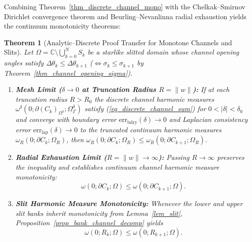 \documentclass[11pt,reqno]{amsart}
\newtheorem{thm}{Theorem}[section]
\numberwithin{equation}{section}
\newcommand{\C}{\mathbb{C}}
\begin{document}
Combining Theorem~\ref{thm_discrete_channel_mono} with the Chelkak--Smirnov Dirichlet convergence theorem \cite[Theorem~3.12]{CS} and Beurling--Nevanlinna radial exhaustion yields the continuum monotonicity theorems:

\begin{thm}[Analytic--Discrete Proof Transfer for Monotone Channels and Slits] \label{thm_analytic_discrete_transfer}
Let $\varOmega = \C \setminus \bigcup_{k=0}^N S_k$ be a starlike slitted domain whose channel opening angles satisfy $\Delta\theta_k \le \Delta\theta_{k+1}$ ($\iff \sigma_k \le \sigma_{k+1}$ by Theorem~\ref{thm_channel_opening_sigma}).
\begin{enumerate}
\item \textbf{Mesh Limit ($\delta \to 0$ at Truncation Radius $R = \|w\|$):} If at each truncation radius $R > R_0$ the discrete channel harmonic measures $\omega^{\delta}(0; \partial(C_k)_{\Omega^{\delta}}; \varOmega^{\delta}_{\varGamma})$ satisfy (\ref{eq_discrete_channel_sum}) for $0 < |\delta| < \delta_0$ and converge with boundary error $\text{err}_{\text{bdry}}(\delta) \to 0$ and Laplacian consistency error $\text{err}_{\text{lap}}(\delta) \to 0$ to the truncated continuum harmonic measures $\omega_R(0; \partial C_k; \varOmega_R)$, then $\omega_R(0; \partial C_k; \varOmega_R) \le \omega_R(0; \partial C_{k+1}; \varOmega_R)$.
\item \textbf{Radial Exhaustion Limit ($R = \|w\| \to \infty$):} Passing $R \to \infty$ preserves the inequality and establishes continuum channel harmonic measure monotonicity:
\begin{equation} \label{eq_continuum_channel_mono}
  \omega(0; \partial C_k; \varOmega) \le \omega(0; \partial C_{k+1}; \varOmega).
\end{equation}
\item \textbf{Slit Harmonic Measure Monotonicity:} Whenever the lower and upper slit banks inherit monotonicity from Lemma~\ref{lem_slit}, Proposition~\ref{prop_bank_channel_decomp} yields
\begin{equation} \label{eq_continuum_slit_mono}
  \omega(0; R_k; \varOmega) \le \omega(0; R_{k+1}; \varOmega).
\end{equation}
\end{enumerate}
\end{thm}
\end{document}
